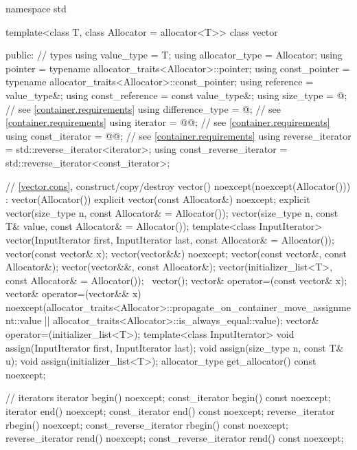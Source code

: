 \begin{codeblock}
namespace std {
  template<class T, class Allocator = allocator<T>>
  class vector {
  public:
    // types
    using value_type             = T;
    using allocator_type         = Allocator;
    using pointer                = typename allocator_traits<Allocator>::pointer;
    using const_pointer          = typename allocator_traits<Allocator>::const_pointer;
    using reference              = value_type&;
    using const_reference        = const value_type&;
    using size_type              = @\impdef@; // see \ref{container.requirements}
    using difference_type        = @\impdef@; // see \ref{container.requirements}
    using iterator               = @@; // see \ref{container.requirements}
    using const_iterator         = @@; // see \ref{container.requirements}
    using reverse_iterator       = std::reverse_iterator<iterator>;
    using const_reverse_iterator = std::reverse_iterator<const_iterator>;

    // \ref{vector.cons}, construct/copy/destroy
    vector() noexcept(noexcept(Allocator())) : vector(Allocator()) { }
    explicit vector(const Allocator&) noexcept;
    explicit vector(size_type n, const Allocator& = Allocator());
    vector(size_type n, const T& value, const Allocator& = Allocator());
    template<class InputIterator>
      vector(InputIterator first, InputIterator last, const Allocator& = Allocator());
    vector(const vector& x);
    vector(vector&&) noexcept;
    vector(const vector&, const Allocator&);
    vector(vector&&, const Allocator&);
    vector(initializer_list<T>, const Allocator& = Allocator());
    ~vector();
    vector& operator=(const vector& x);
    vector& operator=(vector&& x)
      noexcept(allocator_traits<Allocator>::propagate_on_container_move_assignment::value ||
               allocator_traits<Allocator>::is_always_equal::value);
    vector& operator=(initializer_list<T>);
    template<class InputIterator>
      void assign(InputIterator first, InputIterator last);
    void assign(size_type n, const T& u);
    void assign(initializer_list<T>);
    allocator_type get_allocator() const noexcept;

    // iterators
    iterator               begin() noexcept;
    const_iterator         begin() const noexcept;
    iterator               end() noexcept;
    const_iterator         end() const noexcept;
    reverse_iterator       rbegin() noexcept;
    const_reverse_iterator rbegin() const noexcept;
    reverse_iterator       rend() noexcept;
    const_reverse_iterator rend() const noexcept;

}}
\end{codeblock}
